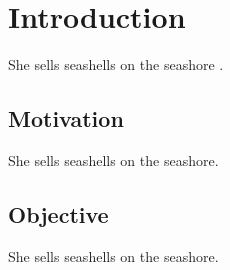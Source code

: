 \chapter{Introduction}

She sells seashells on the seashore \cite{goodfellow2016}.

\section{Motivation}

She sells seashells on the seashore.

\section{Objective}

She sells seashells on the seashore.
